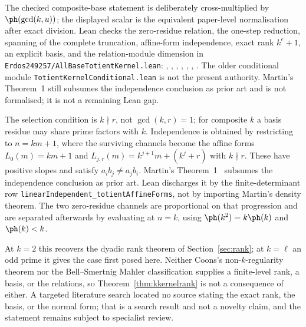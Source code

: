 The checked composite-base statement is deliberately cross-multiplied by
$\ph(\gcd(k,u))$; the displayed scalar is the equivalent paper-level
normalisation after exact division.  Lean checks the zero-residue relation,
the one-step reduction, spanning of the complete truncation, affine-form
independence, exact rank $k^e+1$, an explicit basis, and the relation-module
dimension in \texttt{Erdos249257/AllBaseTotientKernel.lean}:
,
,
,
,
,
,
.
The older conditional module \texttt{TotientKernelConditional.lean} is not
the present authority.  Martin's Theorem~1 still subsumes the independence
conclusion as prior art and is not formalised; it is not a remaining Lean gap.

The selection condition is $k\nmid r$, not $\gcd(k,r)=1$; for composite $k$ a
basis residue may share prime factors with $k$.  Independence is obtained by
restricting to $n=km+1$, where the surviving channels become the affine forms
$L_0(m)=km+1$ and $L_{j,r}(m)=k^{j+1}m+(k^j+r)$ with $k\nmid r$.  These have
positive slopes and satisfy $a_ib_j\neq a_jb_i$.  Martin's
Theorem~1~\cite{martin-phi-inequalities} subsumes the independence conclusion
as prior art.  Lean discharges it by the finite-determinant row
\texttt{linearIndependent\_totientAffineForms}, not by importing Martin's density theorem.  The two zero-residue channels
are proportional on that progression and are separated afterwards by evaluating
at $n=k$, using $\ph(k^2)=k\ph(k)$ and $\ph(k)<k$.

At $k=2$ this recovers the dyadic rank theorem of Section~\ref{sec:rank}; at
$k=\ell$ an odd prime it gives the case first posed here.  Neither Coons's
non-$k$-regularity theorem nor the Bell--Smertnig Mahler classification supplies
a finite-level rank, a basis, or the relations, so
Theorem~\ref{thm:kkernelrank} is not a consequence of either.  A targeted
literature search located no source stating the exact rank, the basis, or the
normal form; that is a search result and not a novelty claim, and the statement
remains subject to specialist review.

